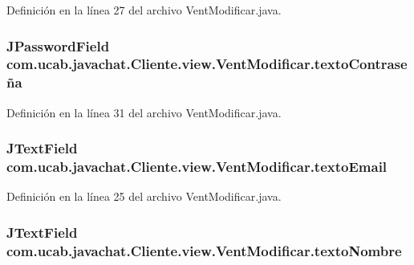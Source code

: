 Definición en la línea 27 del archivo Vent\-Modificar.\-java.

\hypertarget{classcom_1_1ucab_1_1javachat_1_1_cliente_1_1view_1_1_vent_modificar_a55fc3d00a5ddc656635cddaf63a42aa2}{
\subsubsection[{texto\-Contraseña}]{\setlength{\rightskip}{0pt plus 5cm}J\-Password\-Field com.\-ucab.\-javachat.\-Cliente.\-view.\-Vent\-Modificar.\-texto\-Contraseña}}\label{classcom_1_1ucab_1_1javachat_1_1_cliente_1_1view_1_1_vent_modificar_a55fc3d00a5ddc656635cddaf63a42aa2}


Definición en la línea 31 del archivo Vent\-Modificar.\-java.

\hypertarget{classcom_1_1ucab_1_1javachat_1_1_cliente_1_1view_1_1_vent_modificar_a092cc79b753df5f9672bffd8303f0b6f}{
\subsubsection[{texto\-Email}]{\setlength{\rightskip}{0pt plus 5cm}J\-Text\-Field com.\-ucab.\-javachat.\-Cliente.\-view.\-Vent\-Modificar.\-texto\-Email}}\label{classcom_1_1ucab_1_1javachat_1_1_cliente_1_1view_1_1_vent_modificar_a092cc79b753df5f9672bffd8303f0b6f}


Definición en la línea 25 del archivo Vent\-Modificar.\-java.

\hypertarget{classcom_1_1ucab_1_1javachat_1_1_cliente_1_1view_1_1_vent_modificar_a32f1374495a8394c7cc58807692f20ce}{
\subsubsection[{texto\-Nombre}]{\setlength{\rightskip}{0pt plus 5cm}J\-Text\-Field com.\-ucab.\-javachat.\-Cliente.\-view.\-Vent\-Modificar.\-texto\-Nombre}}\label{classcom_1_1ucab_1_1javachat_1_1_cliente_1_1view_1_1_vent_modificar_a32f1374495a8394c7cc58807692f20ce}


